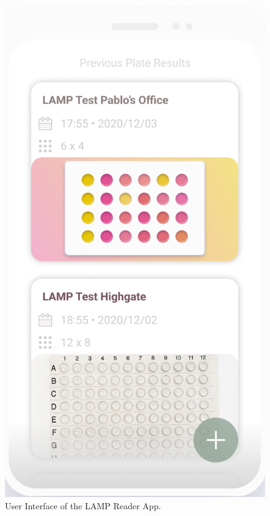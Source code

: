 \begin{figure}[h]
    \centering
    \includegraphics[width=\linewidth]{mnt/fig/lamp-reader-app-ui}
    \caption{User Interface of the LAMP Reader App.}
    \label{fig:my_label}
\end{figure}